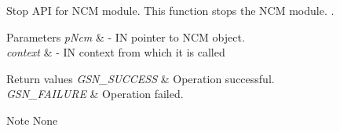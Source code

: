 Stop API for NCM module. This function stops the NCM module. . 


\begin{DoxyParams}{Parameters}
{\em pNcm} & -\/ IN pointer to NCM object. \\
\hline
{\em context} & -\/ IN context from which it is called \\
\hline
\end{DoxyParams}

\begin{DoxyRetVals}{Return values}
{\em GSN\_\-SUCCESS} & Operation successful. \\
\hline
{\em GSN\_\-FAILURE} & Operation failed. \\
\hline
\end{DoxyRetVals}
\begin{DoxyNote}{Note}
None 
\end{DoxyNote}
